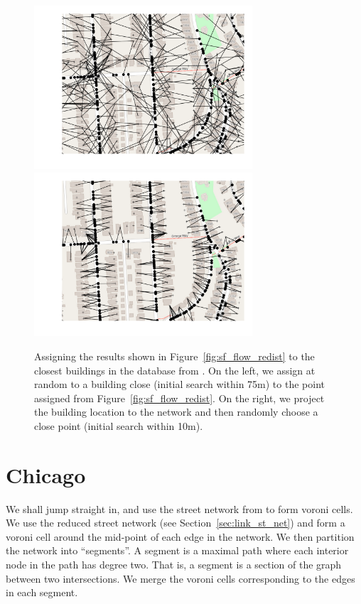 \documentclass[twoside,a4paper,twocolumn,10pt]{article}
\theoremstyle{plain}
\theoremstyle{definition}
\begin{document}
\begin{figure}
  \includegraphics[width=3.2in]{sf_flow_to_buildings_1.png}
  \includegraphics[width=3.2in]{sf_flow_to_buildings_2.png}
  \caption{Assigning the results shown in Figure~\ref{fig:sf_flow_redist} to the closest
  buildings in the database from \cite{oa}.  On the left, we assign at random to a building
  close (initial search within 75m) to the point assigned from Figure~\ref{fig:sf_flow_redist}.
  On the right, we project the building location to the network and then randomly choose
  a close point (initial search within 10m).}
  \label{fig:sf_build_1}
\end{figure}



\section{Chicago}\label{chicago_redist_1}

We shall jump straight in, and use the street network from \cite{tiger} to form voroni cells.
We use the reduced street network (see Section~\ref{sec:link_st_net}) and form a voroni
cell around the mid-point of each edge in the network.  We then partition the network into
``segments''.  A segment is a maximal path where each interior node in the path has degree two.
That is, a segment is a section of the graph between two intersections.  We merge the voroni
cells corresponding to the edges in each segment.
\end{document}
